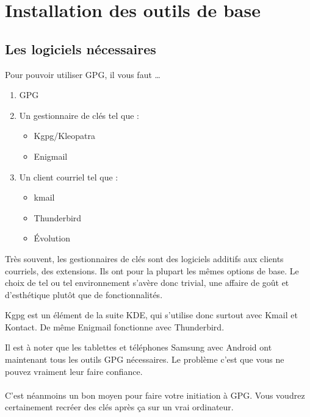 \chapter{Installation des outils de base}

\section{Les logiciels nécessaires}\label{les-logiciels-nuxe9cessaires}

Pour pouvoir utiliser GPG, il vous faut \ldots{}

\begin{enumerate}
\def\labelenumi{\arabic{enumi}.}
\itemsep1pt\parskip0pt
\item
  GPG
\item
  Un gestionnaire de clés tel que :

  \begin{itemize}
  \itemsep1pt\parskip0pt
  \item
    Kgpg/Kleopatra
  \item
    Enigmail
  \end{itemize}
\item
  Un client courriel tel que :

  \begin{itemize}
  \itemsep1pt\parskip0pt
  \item
    kmail
  \item
    Thunderbird
  \item
    Évolution
  \end{itemize}
\end{enumerate}

Très souvent, les gestionnaires de clés sont des logiciels additifs aux
clients courriels, des extensions. Ils ont pour la plupart les mêmes
options de base. Le choix de tel ou tel environnement s'avère donc
trivial, une affaire de goût et d'esthétique plutôt que de
fonctionnalités.

Kgpg est un élément de la suite KDE, qui s'utilise donc surtout avec
Kmail et Kontact. De même Enigmail fonctionne avec Thunderbird.

\begin{notice}
	Il est à noter que les tablettes et téléphones Samsung avec
Android ont maintenant tous les outils GPG nécessaires. Le problème
c'est que vous ne pouvez vraiment leur faire confiance.\\
\\
C'est néanmoins un bon moyen pour faire votre initiation à GPG.
Vous voudrez certainement recréer des clés après ça sur un vrai
ordinateur.
\end{notice}

